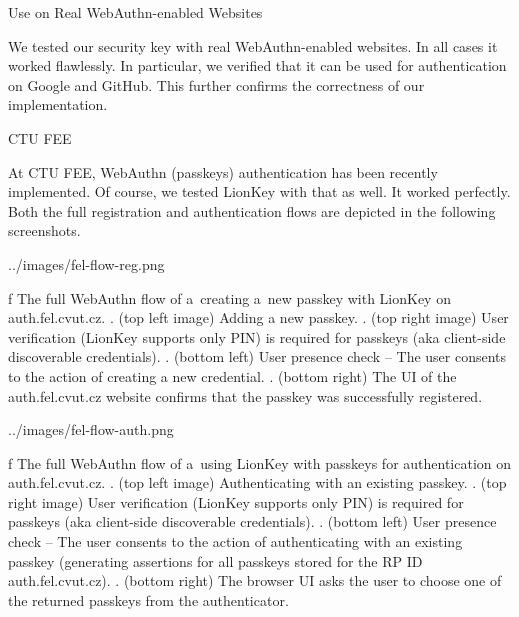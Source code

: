 \sec Use on Real WebAuthn-enabled Websites

We tested our security key with real WebAuthn-enabled websites. In all cases it worked flawlessly. In particular, we verified that it can be used for authentication on {\sbf Google} and {\sbf GitHub}. This further confirms the correctness of our implementation.


\secc CTU FEE

At CTU FEE, WebAuthn (passkeys) authentication has been recently implemented. Of course, we tested LionKey with that as well. It worked perfectly. Both the full registration and authentication flows are depicted in the following screenshots.

\midinsert
{}
\picw=144mm \cinspic ../images/fel-flow-reg.png
\caption/f The full WebAuthn flow of a~creating a~new passkey with LionKey on auth.fel.cvut.cz. {.} (top left image) Adding a new passkey. {.} (top right image) User verification (LionKey supports only PIN) is required for passkeys (aka client-side discoverable credentials). {.} (bottom left) User presence check – The user consents to the action of creating a new credential. {.} (bottom right) The UI of the auth.fel.cvut.cz website confirms that the passkey was successfully registered.
\endinsert


\midinsert
{}
\picw=144mm \cinspic ../images/fel-flow-auth.png
\caption/f The full WebAuthn flow of a~using LionKey with passkeys for authentication on auth.fel.cvut.cz. {.} (top left image) Authenticating with an existing passkey. {.} (top right image) User verification (LionKey supports only PIN) is required for passkeys (aka client-side discoverable credentials). {.} (bottom left) User presence check – The user consents to the action of authenticating with an existing passkey (generating assertions for all passkeys stored for the RP ID auth.fel.cvut.cz). {.} (bottom right) The browser UI asks the user to choose one of the returned passkeys from the authenticator.
\endinsert
